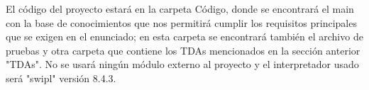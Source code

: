 El código del proyecto estará en la carpeta Código, donde se encontrará el main con la base de conocimientos que nos permitirá cumplir los
requisitos principales que se exigen en el enunciado; en esta carpeta se encontrará también el archivo de pruebas y otra carpeta que contiene los TDAs
 mencionados en la sección anterior "TDAs". No se usará ningún módulo externo al proyecto y el interpretador usado será "swipl" versión 8.4.3.
